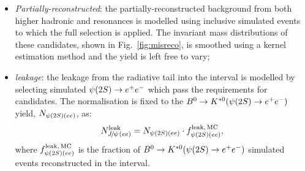 \begin{itemize}

\item \textit{Partially-reconstructed}: the partially-reconstructed background from both higher hadronic and \ccbar resonances
is modelled using inclusive  simulated events to which the full selection is applied. The invariant mass distributions 
of these candidates, shown in Fig.~\ref{fig:misreco}, is smoothed using a kernel estimation method and the yield is left free to vary;



\item \textit{\BdToKstPsi leakage}: the leakage from the \psitwos radiative tail into the \jpsi interval is modelled by 
selecting simulated $\psitwos\to\ee$ which pass the requirements for \jpsi candidates. The normalisation is fixed 
to the $\Bd\to\Kstarz(\psitwos\to\ee)$ yield, $N_{\psitwos(ee)}$, as:
%
$$N_{\jpsi(ee)}^{\rm leak} = N_{\psitwos(ee)} \cdot f_{\psitwos(ee)}^{\rm leak, \,MC},$$
%
where $f_{\psitwos(ee)}^{\rm leak, \,MC}$ is the fraction of $\Bd\to\Kstarz(\psitwos\to\ee)$ simulated events reconstructed in the \jpsi interval.

\end{itemize}

